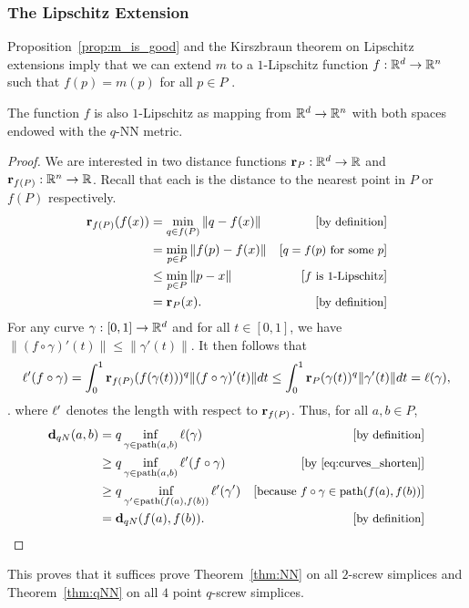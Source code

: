 \subsubsection{The Lipschitz Extension} %
\label{sec:lip_extension}

  Proposition~\ref{prop:m_is_good} and the Kirszbraun theorem on Lipschitz
extensions imply that we can extend $m$ to a $1$-Lipschitz function $f:
\mathbb{R}^d\to \mathbb{R}^n$ such that $f(p) = m(p)$ for all $p\in P$
\cite{Kirszbraun1934,Valentine1945,brehm1981}.

  \begin{lemma}\label{lem:dist_N_lipschitz}
    The function $f$ is also $1$-Lipschitz as mapping from $\mathbb{R}^d\to \mathbb{R}^n$
with both spaces endowed with the $q$-NN metric.
  \end{lemma}
  \begin{proof}
    We are interested in two distance functions $\mathbf{r}_P:\mathbb{R}^d \to \mathbb{R}$ and $\mathbf{r}_{f(P)}: \mathbb{R}^n\to \mathbb{R}$.
    Recall that each is the distance to the nearest point in $P$ or $f(P)$ respectively.
    \begin{align*}
      \mathbf{r}_{f(P)}(f(x)) 
        &= \min_{q\in f(P)} \|q - f(x)\| &\left[\text{\small{by definition}}\right]\\
        &= \min_{p\in P} \|f(p) - f(x)\| &\left[\text{\small{$q = f(p)$ for some $p$}}\right]\\
        &\le \min_{p\in P} \|p - x\| &\left[\text{\small{$f$ is $1$-Lipschitz}}\right]\\ 
        &= \mathbf{r}_P(x). &\left[\text{\small{by definition}}\right]
    \end{align*}
    For any curve $\gamma:[0,1]\to \mathbb{R}^d$ and for all $t\in [0,1]$, we have $\|(f\circ \gamma)'(t)\| \le \|\gamma'(t)\|$.
    It then follows that
    \begin{equation}\label{eq:curves_shorten}
      \ell'(f\circ \gamma) = \int_0^1
\mathbf{r}_{f(P)}(f(\gamma(t)))^q\|(f\circ\gamma)'(t)\|dt \le \int_0^1
\mathbf{r}_{P}(\gamma(t))^q\|\gamma'(t)\|dt = \ell(\gamma),
    \end{equation}.
    where $\ell'$ denotes the length with respect to $\mathbf{r}_{f(P)}$.
    Thus, for all $a,b\in P$,
    \begin{align*}
      \mathbf{d}_{qN}(a,b)
        &= q \inf_{\gamma\in \mathrm{path}(a,b)} \ell(\gamma) &\left[\text{\small{by definition}}\right]\\
        &\ge q \inf_{\gamma\in \mathrm{path}(a,b)} \ell'(f\circ\gamma) &\left[\text{\small{by \eqref{eq:curves_shorten}}}\right]\\
        &\ge q \inf_{\gamma'\in \mathrm{path}(f(a),f(b))} \ell'(\gamma') &\left[\text{\small{because $f\circ\gamma\in \mathrm{path}(f(a), f(b))$}}\right]\\
        &= \mathbf{d}_{qN}(f(a), f(b)). &\left[\text{\small{by definition}}\right]
    \end{align*}
  \end{proof}
This proves that it suffices prove Theorem~\ref{thm:NN} on
all $2$-screw simplices and Theorem~\ref{thm:qNN} on all $4$ point
$q$-screw simplices.


